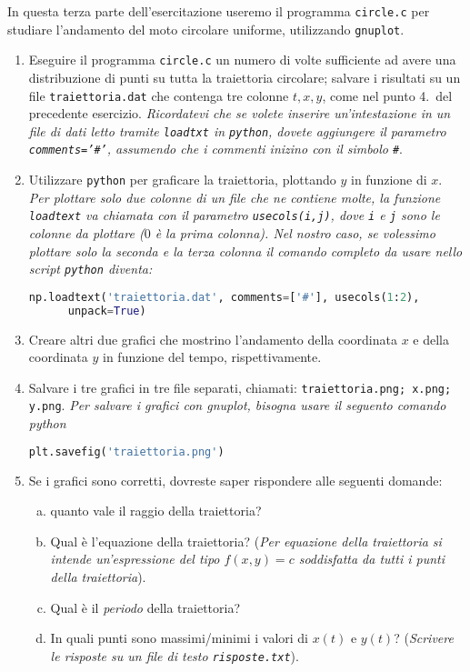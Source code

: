 \documentclass[11pt]{article}
\begin{document}
In questa terza parte dell'esercitazione useremo il programma \texttt{circle.c} per
studiare l'andamento del moto circolare uniforme, utilizzando \texttt{gnuplot}.
\begin{enumerate}
\item Eseguire il programma \texttt{circle.c} un numero di volte sufficiente ad avere una distribuzione di punti su tutta la traiettoria circolare; salvare
  i risultati su un file \texttt{traiettoria.dat} che contenga tre colonne $t,x,y$, come nel punto 4.\ del precedente esercizio.
  {\em Ricordatevi che se volete inserire un'intestazione in un file di dati letto tramite \texttt{loadtxt} in \texttt{python}, dovete aggiungere il parametro \texttt{comments='\#'}, assumendo che i commenti inizino con il simbolo \texttt{\#}}.

\item Utilizzare \texttt{python} per graficare la traiettoria, plottando $y$ in funzione di $x$.
  {\em Per plottare solo due colonne di un file che ne contiene molte, la funzione \texttt{loadtext} va chiamata 
  con il parametro \texttt{usecols(i,j)}, dove \lstinline{i} e \lstinline{j} sono le colonne da plottare ($0$ è la prima colonna). Nel nostro caso, se volessimo plottare solo la seconda e la terza colonna il comando completo da usare nello script \texttt{python} diventa:\/} \\
  \begin{lstlisting}[language=Python,numbers=none]
  np.loadtext('traiettoria.dat', comments=['#'], usecols(1:2),
      unpack=True)
\end{lstlisting}
\item 
  Creare altri due grafici che mostrino l'andamento della coordinata $x$ e della coordinata $y$ in funzione del tempo, rispettivamente.
\item Salvare i tre grafici in tre file separati, chiamati: \texttt{traiettoria.png; x.png; y.png}.
  {\em Per salvare i grafici con gnuplot, bisogna usare il seguento comando python\/}
\begin{lstlisting}[language=Python,numbers=none]
     plt.savefig('traiettoria.png')
\end{lstlisting}
\item Se i grafici sono corretti, dovreste saper rispondere alle seguenti domande:
\begin{enumerate}[(a)]
\item quanto vale il raggio della traiettoria? 
\item Qual \`e l'equazione della traiettoria? ({\em Per equazione della
  traiettoria si intende un'espressione del tipo $f(x,y)=c$ soddisfatta da tutti i punti della traiettoria\/}). 
\item Qual \`e il {\em periodo\/} della traiettoria? 
\item In quali punti sono massimi/minimi i valori di $x(t)$ e $y(t)$? ({\em Scrivere le risposte su un file di testo \texttt{risposte.txt}\/}).
\end{enumerate}
\end{enumerate}
\end{document}
